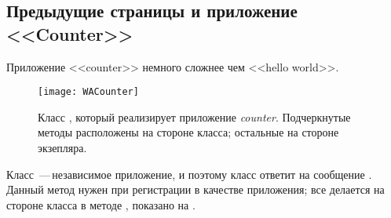 \documentclass[a4paper,10pt,twoside]{book}
\begin{document}

\subsection{Предыдущие страницы и приложение <<Counter>>}


Приложение <<counter>> немного сложнее чем <<hello world>>.

\begin{figure}[ht]
\begin{center}
\texttt{[image: WACounter]}
\caption{Класс , который реализирует приложение
\emph{counter}.
Подчеркнутые методы расположены на стороне класса;
остальные на стороне экзепляра.}
\end{center}
\end{figure}


Класс \,---\,независимое приложение, и поэтому класс 
 ответит  на сообщение
.
Данный метод нужен при регистрации в качестве приложения;
все делается на стороне класса в методе , показано на .

\end{document}
